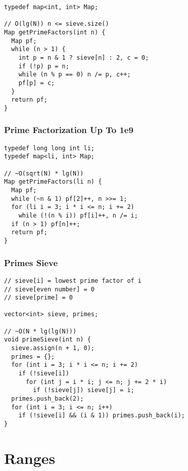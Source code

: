 \documentclass[twoside]{article}
\newcommand{\fileTitleStyle}{\large\underline}
\begin{document}
\begin{multicols*}{2}
\begin{verbatim}
typedef map<int, int> Map;

// O(lg(N)) n <= sieve.size()
Map getPrimeFactors(int n) {
  Map pf;
  while (n > 1) {
    int p = n & 1 ? sieve[n] : 2, c = 0;
    if (!p) p = n;
    while (n % p == 0) n /= p, c++;
    pf[p] = c;
  }
  return pf;
}
\end{verbatim}

\subsubsectionfont{\centering\bfseries\Large}
\subsubsectionfont{\fileTitleStyle}
\subsubsection*{Prime Factorization Up To 1e9}
\begin{verbatim}
typedef long long int li;
typedef map<li, int> Map;

// ~O(sqrt(N) * lg(N))
Map getPrimeFactors(li n) {
  Map pf;
  while (~n & 1) pf[2]++, n >>= 1;
  for (li i = 3; i * i <= n; i += 2)
    while (!(n % i)) pf[i]++, n /= i;
  if (n > 1) pf[n]++;
  return pf;
}
\end{verbatim}

\subsubsectionfont{\centering\bfseries\Large}
\subsubsectionfont{\fileTitleStyle}
\subsubsection*{Primes Sieve}
\begin{verbatim}
// sieve[i] = lowest prime factor of i
// sieve[even number] = 0
// sieve[prime] = 0

vector<int> sieve, primes;

// ~O(N * lg(lg(N)))
void primeSieve(int n) {
  sieve.assign(n + 1, 0);
  primes = {};
  for (int i = 3; i * i <= n; i += 2)
    if (!sieve[i])
      for (int j = i * i; j <= n; j += 2 * i)
        if (!sieve[j]) sieve[j] = i;
  primes.push_back(2);
  for (int i = 3; i <= n; i++)
    if (!sieve[i] && (i & 1)) primes.push_back(i);
}
\end{verbatim}

\sectionfont{\centering\bfseries\Huge}
\vspace{1em}
\section*{Ranges}
\vspace{3em}
\subsectionfont{\centering\bfseries\LARGE}
\vspace{0em}

\end{multicols*}
\end{document}
